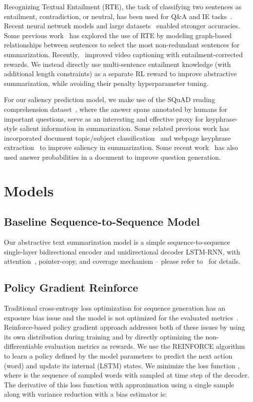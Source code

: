 \documentclass[11pt,a4paper]{article}
\begin{document}
Recognizing Textual Entailment (RTE), the task of classifying two sentences as entailment, contradiction, or neutral, has been used for Q\&A and IE tasks~\cite{harabagiu2006methods,dagan2006pascal,lai2014illinois,jimenez2014unal}. Recent neural network models and large datasets~\cite{bowman2015large,williams2017broad} enabled stronger accuracies. Some previous work~\cite{mehdad2013abstractive,gupta2014text} has explored the use of RTE by modeling graph-based relationships between sentences to select the most non-redundant sentences for summarization. Recently,~ improved video captioning with entailment-corrected rewards. We instead directly use  multi-sentence entailment knowledge (with additional length constraints) as a separate RL reward to improve abstractive summarization, while avoiding their penalty hyperparameter tuning.


For our saliency prediction model, we make use of the SQuAD reading comprehension dataset~\cite{rajpurkar2016squad}, where the answer spans annotated by humans for important questions, serve as an interesting and effective proxy for keyphrase-style salient information in summarization. Some related previous work has incorporated document topic/subject classification~\cite{isonuma2017extractive} and webpage keyphrase extraction~\cite{zhang2004world} to improve saliency in summarization.
Some recent work~ has also used answer probabilities in a document to improve question generation.
 
\section{Models}

\subsection{Baseline Sequence-to-Sequence Model}
Our abstractive text summarization model is a simple sequence-to-sequence single-layer bidirectional encoder and unidirectional decoder LSTM-RNN,
with attention~\cite{bahdanau2014neural}, pointer-copy, and coverage mechanism -- please refer to~ for details.

\subsection{Policy Gradient Reinforce}
Traditional cross-entropy loss optimization for sequence generation has an exposure bias issue and the model is not optimized for the evaluated metrics~\cite{ranzato2015sequence}. Reinforce-based policy gradient approach addresses both of these issues by using its own distribution during training and by directly optimizing the non-differentiable evaluation metrics as rewards. We use the REINFORCE algorithm~\cite{williams1992simple,zaremba2015reinforcement} to learn a policy  defined by the model parameters  to predict the next action (word) and update its internal (LSTM) states. We minimize the loss function , where  is the sequence of sampled words with  sampled at time step  of the decoder. The derivative of this loss function with approximation using a single sample along with variance reduction with a bias estimator is:
\end{document}
